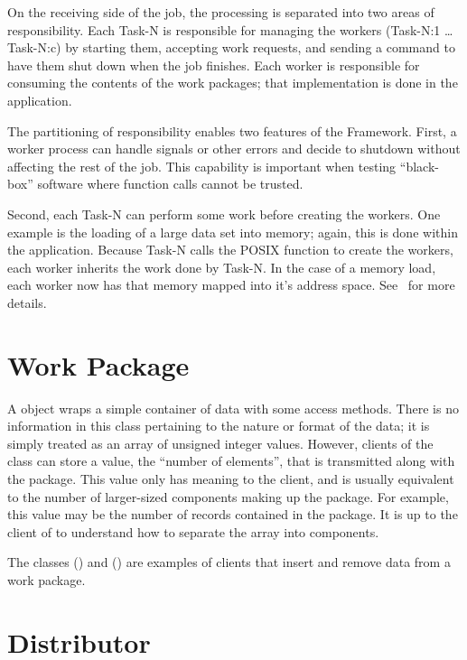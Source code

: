 On the receiving side of the job, the processing is separated into two areas
of responsibility. Each Task-N is responsible for managing the workers
(Task-N:1 \ldots Task-N:c) by starting them, accepting work requests, and
sending a command to have them shut down when the job finishes. Each worker
is responsible for consuming the contents of the work packages; that
implementation is done in the application.

The partitioning of responsibility enables two features of the Framework.
First, a worker process can handle signals or other errors and decide to
shutdown without affecting the rest of the job. This capability is important
when testing ``black-box'' software where function calls cannot be trusted.

Second, each Task-N can perform some work before creating the workers. One
example is the loading of a large data set into memory; again, this is done
within the application. Because Task-N calls the POSIX function 
to create the workers, each worker inherits the work done by Task-N. In the
case of a memory load, each worker now has that memory mapped into it's address
space. See~ for more details.

\section{Work Package}
\label{sec-workpackage}

A  object wraps a simple container of data
with some access methods. There is no information in this class pertaining to
the nature or format of the data; it is simply treated as an array of unsigned
integer values. However, clients of the class can store a value, the ``number
of elements'', that is transmitted along with the package. This value only
has meaning to the client, and is usually equivalent to the number of
larger-sized components making up the package. For example, this value may
be the number of records contained in the package. It is up to the client
of  to understand how to separate the array into components.

The classes  ()
and  ()
are examples of  clients that insert and remove data from
a work package.

\section{Distributor}
\label{sec-workpackagedistributor}

